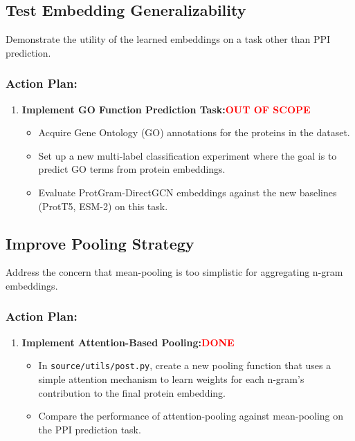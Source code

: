 \documentclass[11pt, a4paper]{article}
\begin{document}
	\subsection{Test Embedding Generalizability}
	Demonstrate the utility of the learned embeddings on a task other than PPI prediction.
	\subsubsection*{Action Plan:}
	\begin{enumerate}
		\item \textbf{Implement GO Function Prediction Task:\textcolor{red}{OUT OF SCOPE}}
		\begin{itemize}
			\item Acquire Gene Ontology (GO) annotations for the proteins in the dataset.
			\item Set up a new multi-label classification experiment where the goal is to predict GO terms from protein embeddings.
			\item Evaluate ProtGram-DirectGCN embeddings against the new baselines (ProtT5, ESM-2) on this task.
		\end{itemize}
	\end{enumerate}
	
	\subsection{Improve Pooling Strategy}
	Address the concern that mean-pooling is too simplistic for aggregating n-gram embeddings.
	\subsubsection*{Action Plan:}
	\begin{enumerate}
		\item \textbf{Implement Attention-Based Pooling:\textcolor{red}{DONE}}
		\begin{itemize}
			\item In \texttt{source/utils/post.py}, create a new pooling function that uses a simple attention mechanism to learn weights for each n-gram's contribution to the final protein embedding.
			\item Compare the performance of attention-pooling against mean-pooling on the PPI prediction task.
		\end{itemize}
	\end{enumerate}
	
	\newpage
	
\end{document}
